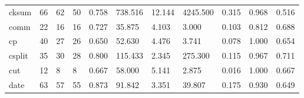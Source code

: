 \begin{longtable}{lp{1.2cm}p{1.2cm}p{1.2cm}p{1.2cm}p{1.2cm}p{1.2cm}p{1.2cm}p{1.2cm}p{1.2cm}p{1.2cm}}
cksum     &                           66 &                 62 &                                50 &                                      0.758 &                                738.516 &                                       12.144 &                          4245.500 &                                   0.315 &                              0.968 &                                              0.516 \\
comm      &                           22 &                 16 &                                16 &                                      0.727 &                                 35.875 &                                        4.103 &                             3.000 &                                   0.103 &                              0.812 &                                              0.688 \\
cp        &                           40 &                 27 &                                26 &                                      0.650 &                                 52.630 &                                        4.476 &                             3.741 &                                   0.078 &                              1.000 &                                              0.654 \\
csplit    &                           35 &                 30 &                                28 &                                      0.800 &                                115.433 &                                        2.345 &                           275.300 &                                   0.115 &                              0.967 &                                              0.711 \\
cut       &                           12 &                  8 &                                 8 &                                      0.667 &                                 58.000 &                                        5.141 &                             2.875 &                                   0.016 &                              1.000 &                                              0.667 \\
date      &                           63 &                 57 &                                55 &                                      0.873 &                                 91.842 &                                        3.351 &                            39.807 &                                   0.175 &                              0.930 &                                              0.649 \\

\end{longtable}
